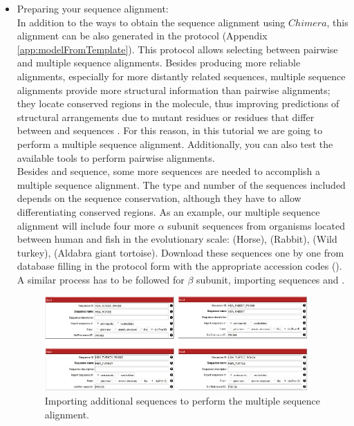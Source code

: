  \begin{itemize}
 \item Preparing your sequence alignment:\\
In addition to the ways to obtain the  sequence alignment using $Chimera$, this alignment can be also generated in the \scipion protocol  (Appendix \ref{app:modelFromTemplate}). This protocol allows selecting between pairwise and multiple sequence alignments. Besides producing more reliable alignments, especially for more distantly related sequences, multiple sequence alignments provide more structural information than pairwise alignments; they locate conserved regions in the molecule, thus improving predictions of structural arrangements due to mutant residues or residues that differ between  and  sequences \citep{pearson2013}. For this reason, in this tutorial we are going to perform a multiple sequence alignment. Additionally, you can also test the available tools to perform pairwise alignments.\\
 
Besides  and  sequence, some more sequences are needed to accomplish a multiple sequence alignment. The type and number of the sequences included depends on the sequence conservation, although they have to allow differentiating conserved regions. As an example, our multiple sequence alignment will include four more  $\alpha$ subunit sequences from organisms located between human and fish in the evolutionary scale:  (Horse),  (Rabbit),  (Wild turkey),  (Aldabra giant tortoise). Download these sequences one by one from  database filling in the  protocol form with the appropriate accession codes (). A similar process has to be followed for  $\beta$ subunit, importing  sequences  and .

  \begin{figure}[H]
  \centering 
  \captionsetup{width=.7\linewidth} 
  \includegraphics[width=0.95\textwidth]{Images/Fig12}
  \caption{Importing additional sequences to perform the multiple sequence alignment.}
  \label{fig:multialignment_sequences}
  \end{figure}


\end{itemize}
